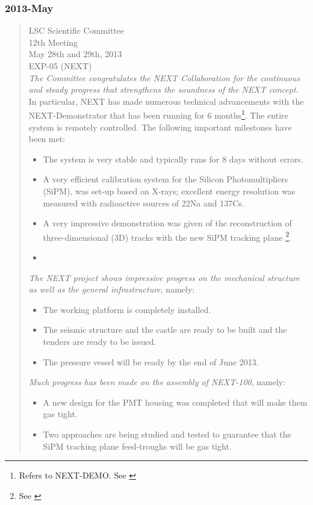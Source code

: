 \subsubsection*{2013-May}
\begin{quotation}
LSC Scientific Committee \\
12th Meeting \\
May 28th and 29th, 2013\\
EXP-05 (NEXT)\\

{\em The Committee congratulates the NEXT Collaboration for the continuous and steady progress that strengthens the soundness of the NEXT concept}. In particular, NEXT has made numerous technical advancements with the NEXT-Demonstrator that has been running for 6 months\footnote{Refers to NEXT-DEMO. See \cite{Alvarez:2012yxw, Alvarez:2012zsz,Alvarez:2012hu,Alvarez:2013gxa,Lorca:2014sra,Renner:2014mha,Serra:2014zda,Ferrario:2015kta} }. The entire system is remotely controlled. The following important milestones have been met: 

\begin{itemize}
\item The system is very stable and typically runs for 8 days without errors. 
\item A very efficient calibration system for the Silicon Photomultipliers (SiPM), was set-up based on X-rays; excellent energy resolution was measured with radioactive sources of 22Na and 137Cs.
\item A very impressive demonstration was given of the reconstruction of three-dimensional (3D) tracks with the new SiPM tracking plane \footnote{See \cite{Ferrario:2015kta} }.
\item 
\end{itemize}
	 
{\em The NEXT project shows impressive progress on the mechanical structure as well as the general infrastructure}, namely:
\begin{itemize}
\item The working platform is completely installed.
\item The seismic structure and the castle are ready to be built and the tenders are ready to be issued.
\item  The pressure vessel will be ready by the end of June 2013.
\end{itemize}

{\em	
Much progress has been made on the assembly of NEXT-100}, namely:
\begin{itemize}
\item A new design for the PMT housing was completed that will make them gas tight.  
\item Two approaches are being studied and tested to guarantee that the SiPM tracking plane feed-troughs will be gas tight.
\end{itemize}


\end{quotation}
